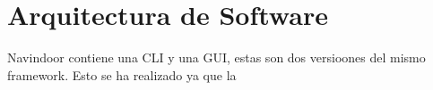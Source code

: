 \section{Arquitectura de Software}\label{S3}

Navindoor contiene una CLI y una GUI, estas son dos versioones del mismo framework. Esto se ha realizado ya  que la 